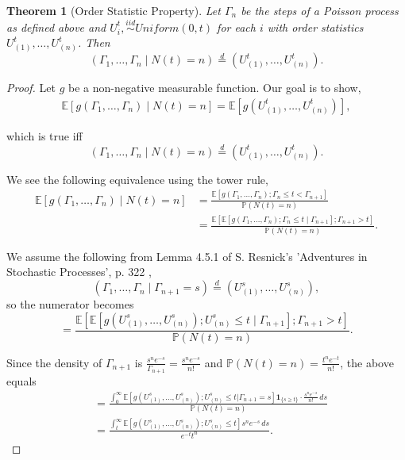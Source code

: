 \documentclass[11pt, oneside]{article}   	%
\newtheorem{theorem}{Theorem}[section]
\theoremstyle{definition}
\theoremstyle{remark}
\begin{document}
\begin{theorem}[Order Statistic Property]
Let $\Gamma_n$ be the steps of a Poisson process as defined above and
$U_i^t, \stackrel{iid}{\sim} \textit{Uniform}(0,t)$ for each $i$ with order statistics
$U_{(1)}^t,\dots,U_{(n)}^t$. Then
\[
(\Gamma_1,\dots,\Gamma_n \mid N(t)=n)
\stackrel{d}{=}
(U_{(1)}^t,\dots,U_{(n)}^t).
\]
\end{theorem}

\begin{proof}
Let $g$ be a non-negative measurable function. Our goal is to show,
\begin{align*}
\mathbb{E}\left[g(\Gamma_1,\dots,\Gamma_n)\mid N(t)=n\right]= \mathbb{E}\left[g(U_{(1)}^t,\dots,U_{(n)}^t)\right],
\end{align*}

which is true iff $$(\Gamma_1,\dots,\Gamma_n \mid N(t)=n) \stackrel{d}{=} (U_{(1)}^t,\dots,U_{(n)}^t).$$

We see the following equivalence using the tower rule,
\begin{align*}
\mathbb{E}[g(\Gamma_1,\dots,\Gamma_n)\mid N(t)=n] &= \frac{\mathbb{E}\left[g(\Gamma_1,\dots,\Gamma_n); \Gamma_n \le t < \Gamma_{n+1}\right]}{\mathbb{P}(N(t)=n)} \\
						  &= \frac{\mathbb{E}\left[\mathbb{E}\left[g(\Gamma_1,\dots,\Gamma_n); \Gamma_n \le t\mid \Gamma_{n+1}\right]; \Gamma_{n+1}>t \right]}{\mathbb{P}(N(t)=n)}.
\end{align*}

We assume the following from Lemma 4.5.1 of S. Resnick's 'Adventures in Stochastic Processes', p. 322 \cite{resnick2005}, 
$$(\Gamma_1,\dots,\Gamma_n \mid \Gamma_{n+1}=s) \stackrel{d}{=} (U_{(1)}^s,\dots,U_{(n)}^s),$$
so the numerator becomes
$$= \frac{\mathbb{E}\left[\mathbb{E}\left[g(U_{(1)}^s,\dots,U_{(n)}^s); U_{(n)}^s \le t\mid \Gamma_{n+1}\right]; \Gamma_{n+1}>t \right]}{\mathbb{P}(N(t)=n)}. $$

Since the density of $\Gamma_{n+1}$ is $\frac{s^n e^{-s}}{\Gamma_{n+1}} = \frac{s^n e^{-s}}{n!}$ and $\mathbb{P}(N(t)=n)=\frac{t^n e^{-t}}{n!}$, the above equals
\begin{align*}
  &= \frac{\int_0^\infty\mathbb{E} \left[g(U_{(1)}^s,\dots,U_{(n)}^s);U_{(n)}^s \le t | \Gamma_{n+1} = s \right] \mathbf{1}_{\{s \geq t\}} \cdot \frac{s^n e^{-s}}{n!}\,ds} {\mathbb{P}(N(t)=n)} \\
  &= \frac{\int_t^\infty\mathbb{E}\!\left[g(U_{(1)}^s,\dots,U_{(n)}^s); U_{(n)}^s \le t\right] s^n e^{-s}\,ds}{e^{-t}t^n}.
\end{align*}


\end{proof}
\end{document}
